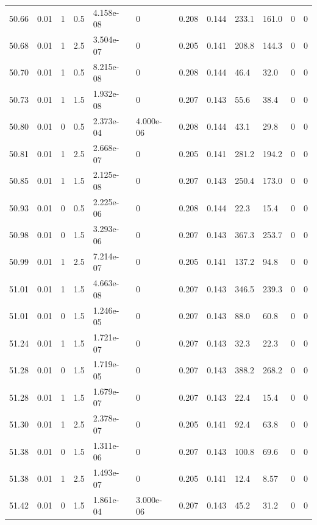 \documentclass[preview]{standalone}
\begin{document}
{{{{{{{{{{{{{{{{\begin{tabular}{L{1.2cm}C{1.2cm} C{0.3cm}C{0.5cm} C{1.4cm}C{1.4cm} C{1.4cm}C{1.4cm} C{1.6cm}C{1.6cm} C{1.6cm}C{1.6cm}}
  50.66  &  0.01  & 1     & 0.5 &  4.158e-08  & 0  &  0.208&   0.144& 233.1 & 161.0   &  0 & 0  \\ 
  50.68  &  0.01  & 1     & 2.5 &  3.504e-07  & 0  &  0.205&   0.141& 208.8 & 144.3   &  0 & 0  \\ 
  50.70  &  0.01  & 1     & 0.5 &  8.215e-08  & 0  &  0.208&   0.144& 46.4 & 32.0   &  0 & 0  \\ 
  50.73  &  0.01  & 1     & 1.5 &  1.932e-08  & 0  &  0.207&   0.143& 55.6 & 38.4   &  0 & 0  \\ 
  50.80  &  0.01  & 0     & 0.5 &  2.373e-04  & 4.000e-06  &  0.208&   0.144& 43.1 & 29.8   &  0 & 0  \\ 
  50.81  &  0.01  & 1     & 2.5 &  2.668e-07  & 0  &  0.205&   0.141& 281.2 & 194.2   &  0 & 0  \\ 
  50.85  &  0.01  & 1     & 1.5 &  2.125e-08  & 0  &  0.207&   0.143& 250.4 & 173.0   &  0 & 0  \\ 
  50.93  &  0.01  & 0     & 0.5 &  2.225e-06  & 0  &  0.208&   0.144& 22.3 & 15.4   &  0 & 0  \\ 
  50.98  &  0.01  & 0     & 1.5 &  3.293e-06  & 0  &  0.207&   0.143& 367.3 & 253.7   &  0 & 0  \\ 
  50.99  &  0.01  & 1     & 2.5 &  7.214e-07  & 0  &  0.205&   0.141& 137.2 & 94.8   &  0 & 0  \\ 
  51.01  &  0.01  & 1     & 1.5 &  4.663e-08  & 0  &  0.207&   0.143& 346.5 & 239.3   &  0 & 0  \\ 
  51.01  &  0.01  & 0     & 1.5 &  1.246e-05  & 0  &  0.207&   0.143& 88.0 & 60.8   &  0 & 0  \\ 
  51.24  &  0.01  & 1     & 1.5 &  1.721e-07  & 0  &  0.207&   0.143& 32.3 & 22.3   &  0 & 0  \\ 
  51.28  &  0.01  & 0     & 1.5 &  1.719e-05  & 0  &  0.207&   0.143& 388.2 & 268.2   &  0 & 0  \\ 
  51.28  &  0.01  & 1     & 1.5 &  1.679e-07  & 0  &  0.207&   0.143& 22.4 & 15.4   &  0 & 0  \\ 
  51.30  &  0.01  & 1     & 2.5 &  2.378e-07  & 0  &  0.205&   0.141& 92.4 & 63.8   &  0 & 0  \\ 
  51.38  &  0.01  & 0     & 1.5 &  1.311e-06  & 0  &  0.207&   0.143& 100.8 & 69.6   &  0 & 0  \\ 
  51.38  &  0.01  & 1     & 2.5 &  1.493e-07  & 0  &  0.205&   0.141& 12.4 & 8.57   &  0 & 0  \\ 
  51.42  &  0.01  & 0     & 1.5 &  1.861e-04  & 3.000e-06  &  0.207&   0.143& 45.2 & 31.2   &  0 & 0  \\ 

\end{tabular}}}}}}}}}}}}}}}}}
\end{document}

